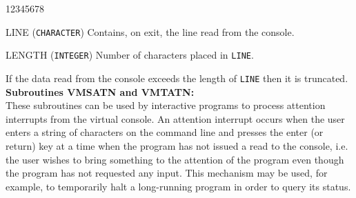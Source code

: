\begin{DLtt}{12345678}
\item[LINE] ({\tt CHARACTER}) Contains, on exit, the line
read from the console.
\item[LENGTH] ({\tt INTEGER}) Number of characters placed in {\tt LINE}.
\end{DLtt}
If the data read from the console exceeds the length of {\tt LINE}
then it is truncated. \\[3mm]
\newpage
{\bf Subroutines VMSATN and VMTATN:} \\[2mm]
These subroutines can be used by interactive programs to process
attention interrupts from the virtual console. An attention interrupt
occurs when the user enters a string of characters on the command line
and presses the enter (or return) key at a time when the program has not
issued a read to the console, i.e. the user wishes to bring something to
the attention of the program even though the program has not requested
any input. This mechanism may be used, for example, to temporarily halt
a long-running program in order to query its status.
 
